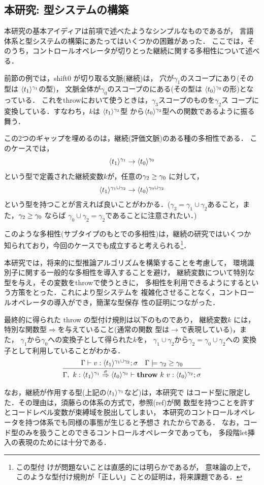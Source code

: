 \subsection{本研究: 型システムの構築}

本研究の基本アイディアは前項で述べたようなシンプルなものであるが，
言語体系と型システムの構築にあたってはいくつかの困難があった．
ここでは，そのうち，コントロールオペレータが切りとった継続に関する多相性について述べる．

前節の例では，shift0 が切り取る文脈(継続)は，
穴が$\gamma_1$のスコープにあり(その型は $\langle{t_1}\rangle^{\gamma_1}$の型)，
文脈全体が$\gamma_0$のスコープのにある(その型は
$\langle{t_0}\rangle^{\gamma_0}$の形)となっている．
これをthrowにおいて使うときは，$\gamma_3$スコープのものを$\gamma_2$ス
コープに変換している．すなわち，$k$は $\langle{t_1}\rangle^{\gamma_3}$型
から$\langle{t_0}\rangle^{\gamma_2}$型への関数であるように振る舞う．

この2つのギャップを埋めるのは，継続(評価文脈)のある種の多相性である．
このケースでは，
\[\langle{t_1}\rangle^{\gamma_1} \to \langle{t_0}\rangle^{\gamma_0} \]
という型で定義された継続変数$k$が，任意の$\gamma_2 \ge \gamma_0$ に対して，
\[\langle{t_1}\rangle^{\gamma_1 \cup \gamma_2} \to \langle{t_0}\rangle^{\gamma_0 \cup \gamma_2} \]
という型を持つことが言えれば良いことがわかる．($\gamma_3 = \gamma_1
\cup \gamma_2$あること，また，$\gamma_2 \ge \gamma_0$ ならば
$\gamma_0 \cup \gamma_2 = \gamma_2$であることに注意されたい．)

このような多相性(サブタイプのもとでの多相性)は，継続の研究ではいくつか
知られており，今回のケースでも成立すると考えられる\footnote{この型付
けが問題ないことは直感的には明らかであるが，
意味論の上で，このような型付け規則が「正しい」ことの証明は，将来課題である．}．

本研究では，将来的に型推論アルゴリズムを構築することを考慮して，
環境識別子に関する一般的な多相性を導入することを避け，
継続変数について特別な型を与え，その変数をthrowで使うときに，
多相性を利用できるようにするという方策をとった．これにより型システムを
複雑化させることなく，コントロールオペレータの導入ができ，簡潔な型保存
性の証明につながった．

最終的に得られた throw の型付け規則は以下のものであり，
継続変数$k$ には，特別な関数型$\Rightarrow$を与えていること(通常の関数
型は$\rightarrow$で表現している)，また，
$\gamma_1$から$\gamma_0$への変換子として得られた$k$を，
$\gamma_1\cup \gamma_2$から$\gamma_2 = \gamma_0 \cup \gamma_2$への
変換子として利用していることがわかる．
\[
  \infer
  {\Gamma,~k:\contT{\codeT{t_1}{\gamma_1}}{\codeT{t_0}{\gamma_0}}{\sigma}
    \vdash \throw{k}{v} : \codeT{t_0}{\gamma_2} ; \sigma}
  {\Gamma
    \vdash v : \codeT{t_1}{\gamma_1 \cup \gamma_2} ; \sigma
    & \Gamma \models \gamma_2 \ord \gamma_0
  }
\]

なお，継続が作用する型(上記の$\langle{t_1}\rangle^{\gamma_1}$など)は，本研究で
はコード型に限定した．その理由は，須藤らの体系の方式で，参照(ref)が関
数型を持つことを許すとコードレベル変数が束縛域を脱出してしまい，
本研究のコントロールオペレータを持つ体系でも同様の事態が生じると予想さ
れたからである．
なお，コード型のみを扱うことのできるコントロールオペレータであっても，
多段階let挿入の表現のためには十分である．

